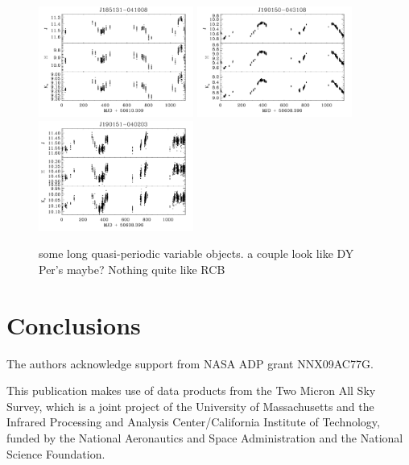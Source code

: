 \documentclass[]{emulateapj}
\begin{document}
\begin{figure}[]
\includegraphics[width=2.0in]{new_plots/ll_36}
\includegraphics[width=2.0in]{new_plots/ll_40}
\includegraphics[width=2.0in]{new_plots/ll_41}
\caption{some long quasi-periodic variable objects. a couple look like DY Per's maybe? Nothing quite like RCB}
\label{ll}
\end{figure}




% 



%

\section{Conclusions}



\acknowledgements
The authors acknowledge support from NASA ADP grant NNX09AC77G.

This publication makes use of data products from the Two Micron All Sky Survey, which is a joint project of the University of Massachusetts and the Infrared Processing and Analysis Center/California Institute of Technology, funded by the National Aeronautics and Space Administration and the National Science Foundation.






\end{document}
